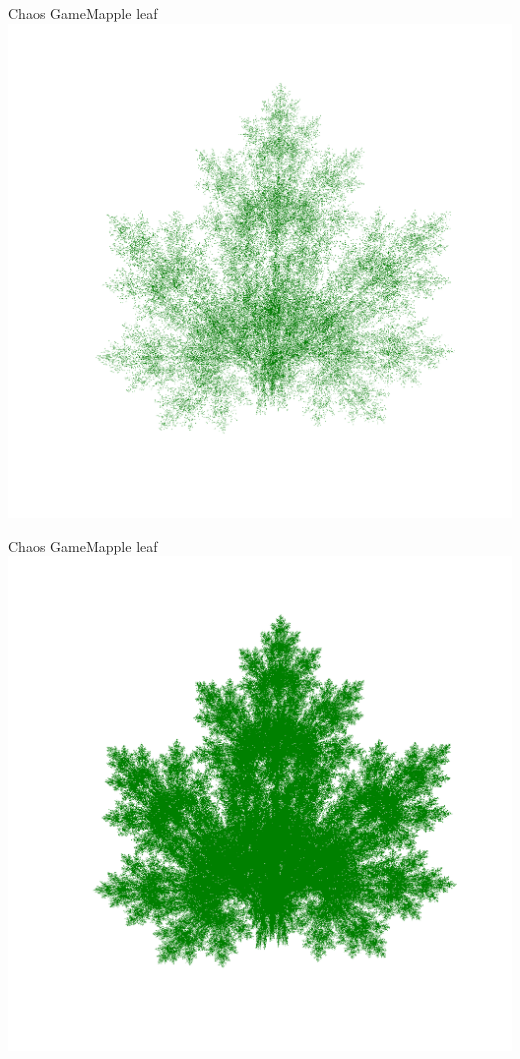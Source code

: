 \documentclass[usenames,dvipsnames,svgnames,10pt,aspectratio=169]{beamer}
\begin{document}
\begin{frame}[t, c]{Chaos Game}{Mapple leaf}
	\centering
	\includegraphics[height=.8\textheight]{Mapple_leaf_4}
	\vspace{1cm}
\end{frame}

\begin{frame}[t, c]{Chaos Game}{Mapple leaf}
	\centering
	\includegraphics[height=.8\textheight]{Mapple_leaf_5}
	\vspace{1cm}
\end{frame}
\end{document}

